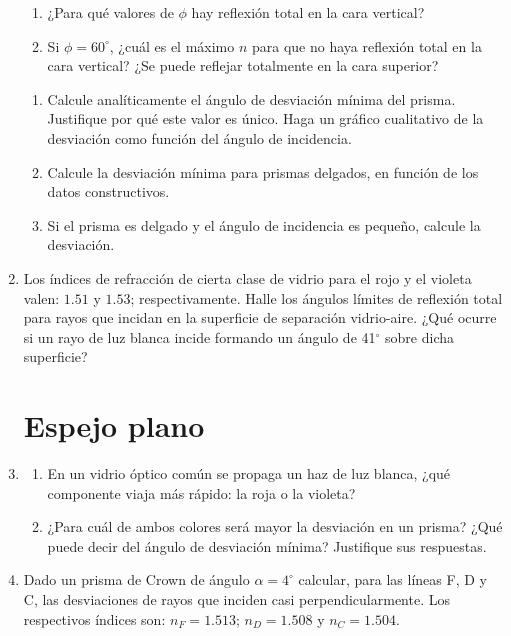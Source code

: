 \documentclass[11pt,spanish,a4paper]{article}
\begin{document}
\begin{enumerate}
\begin{enumerate}
\item ¿Para qué valores de $\phi$ hay reflexión total en la cara vertical?
\item Si $\phi=60^{\circ}$, ¿cuál es el máximo $n$ para que no haya reflexión
total en la cara vertical? ¿Se puede reflejar totalmente en la cara
superior?
\end{enumerate}



\begin{enumerate}
\item Calcule analíticamente el ángulo de desviación mínima del prisma.
Justifique por qué este valor es único. Haga un gráfico cualitativo
de la desviación como función del ángulo de incidencia.
\item Calcule la desviación mínima para prismas delgados, en función de
los datos constructivos.
\item Si el prisma es delgado y el ángulo de incidencia es pequeño, calcule
la desviación.
\end{enumerate}


\item Los índices de refracción de cierta clase de vidrio para el rojo y
el violeta valen: $1.51$ y $1.53$; respectivamente. Halle los ángulos
límites de reflexión total para rayos que incidan en la superficie
de separación vidrio-aire. ¿Qué ocurre si un rayo de luz blanca incide
formando un ángulo de 41$^{\circ}$ sobre dicha superficie?


\section*{Espejo plano}


\item
\begin{enumerate}
\item En un vidrio óptico común se propaga un haz de luz blanca, ¿qué componente
viaja más rápido: la roja o la violeta?
\item ¿Para cuál de ambos colores será mayor la desviación en un prisma?
¿Qué puede decir del ángulo de desviación mínima? Justifique sus respuestas.
\end{enumerate}


\item Dado un prisma de Crown de ángulo $\alpha=4^{\circ}$ calcular, para
las líneas F, D y C, las desviaciones de rayos que inciden casi perpendicularmente.
Los respectivos índices son: $n_{F}=1.513$; $n_{D}=1.508$ y $n_{C}=1.504$.



\end{enumerate}
\end{document}
